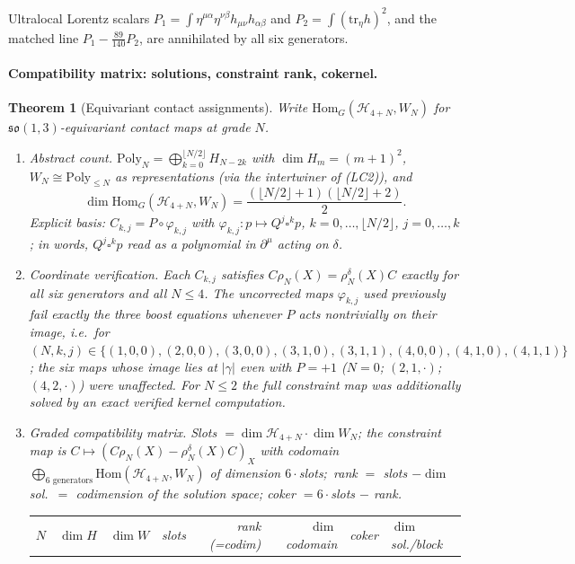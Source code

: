 \documentclass{article}
\newtheorem{theorem}[proposition]{Theorem}
\theoremstyle{remark}
\begin{document}
Ultralocal Lorentz scalars $P_1=\int\eta^{\mu\alpha}\eta^{\nu\beta}h_{\mu\nu}h_{\alpha\beta}$ and $P_2=\int(\mathrm{tr}_\eta h)^2$, and the matched line $P_1-\tfrac{89}{140}P_2$, are annihilated by all six generators.

\paragraph{Compatibility matrix: solutions, constraint rank, cokernel.}
\begin{theorem}[Equivariant contact assignments]
\label{thm:M7-compat}
Write $\mathrm{Hom}_G(\mathcal H_{4+N},W_N)$ for $\mathfrak{so}(1,3)$-equivariant contact maps at grade $N$.
\begin{enumerate}
\item \emph{Abstract count.} $\mathrm{Poly}_N=\bigoplus_{k=0}^{\lfloor N/2\rfloor}H_{N-2k}$ with $\dim H_m=(m+1)^2$, $W_N\cong\mathrm{Poly}_{\le N}$ as representations (via the intertwiner of (LC2)), and
\[
\dim\mathrm{Hom}_G(\mathcal H_{4+N},W_N)=\frac{(\lfloor N/2\rfloor+1)(\lfloor N/2\rfloor+2)}{2}.
\]
Explicit basis: $C_{k,j}=P\circ\varphi_{k,j}$ with $\varphi_{k,j}:p\mapsto Q^j\square^k p$, $k=0,\ldots,\lfloor N/2\rfloor$, $j=0,\ldots,k$; in words, $Q^j\square^kp$ read as a polynomial in $\partial^\mu$ acting on $\delta$.
\item \emph{Coordinate verification.} Each $C_{k,j}$ satisfies $C\rho_N(X)=\rho^\delta_N(X)C$ exactly for all six generators and all $N\le4$.
The uncorrected maps $\varphi_{k,j}$ used previously fail exactly the three boost equations whenever $P$ acts nontrivially on their image, i.e.\ for $(N,k,j)\in\{(1,0,0),\allowbreak (2,0,0),\allowbreak (3,0,0),\allowbreak (3,1,0),\allowbreak (3,1,1),\allowbreak (4,0,0),\allowbreak (4,1,0),\allowbreak (4,1,1)\}$; the six maps whose image lies at $|\gamma|$ even with $P=+1$ ($N=0$; $(2,1,\cdot)$; $(4,2,\cdot)$) were unaffected.
For $N\le2$ the full constraint map was additionally solved by an exact verified kernel computation.
\item Graded compatibility matrix. Slots $=\dim\mathcal H_{4+N}\cdot\dim W_N$; the constraint map is $C\mapsto(C\rho_N(X)-\rho^\delta_N(X)C)_{X}$ with codomain $\bigoplus_{6\text{ generators}}\mathrm{Hom}(\mathcal H_{4+N},W_N)$ of dimension $6\cdot$slots;\allowbreak\ rank $=$ slots $-\dim$ sol.\ $=$ codimension of the solution space; coker $=6\cdot$slots $-$ rank.
\begin{center}
\begin{tabular}{crrrrrrl}
$N$ & $\dim H$ & $\dim W$ & slots & rank (=codim) & $\dim$ codomain & coker & $\dim$ sol./block\\

\end{tabular}
\end{center}
\end{enumerate}
\end{theorem}
\end{document}
